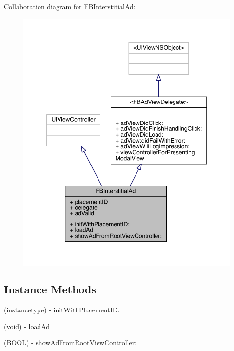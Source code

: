 Collaboration diagram for F\-B\-Interstitial\-Ad\-:
\nopagebreak
\begin{figure}[H]
\begin{center}
\leavevmode
\includegraphics[width=350pt]{interface_f_b_interstitial_ad__coll__graph}
\end{center}
\end{figure}
\subsection*{Instance Methods}
\begin{DoxyCompactItemize}
\item 
(instancetype) -\/ \hyperlink{interface_f_b_interstitial_ad_afb4f482b5ab19d486c77785c7794111d}{init\-With\-Placement\-I\-D\-:}
\item 
(void) -\/ \hyperlink{interface_f_b_interstitial_ad_a4bbd516a1c5f381ab7af76c2e113fd86}{load\-Ad}
\item 
(B\-O\-O\-L) -\/ \hyperlink{interface_f_b_interstitial_ad_ac9c071a5f699e990e1fa65060fe5c1ce}{show\-Ad\-From\-Root\-View\-Controller\-:}
\end{DoxyCompactItemize}

